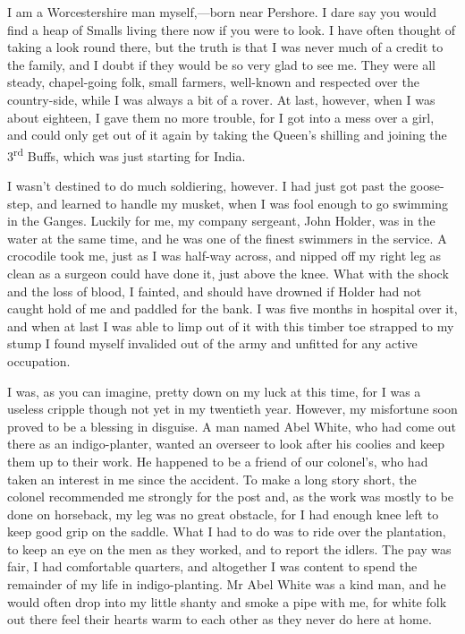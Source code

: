I am a Worcestershire man myself,—born near Pershore. I dare say you would find a heap of Smalls living there now if you were to look. I have often thought of taking a look round there, but the truth is that I was never much of a credit to the family, and I doubt if they would be so very glad to see me. They were all steady, chapel-going folk, small farmers, well-known and respected over the country-side, while I was always a bit of a rover. At last, however, when I was about eighteen, I gave them no more trouble, for I got into a mess over a girl, and could only get out of it again by taking the Queen's shilling and joining the 3\textsuperscript{rd} Buffs, which was just starting for India.

I wasn't destined to do much soldiering, however. I had just got past the goose-step, and learned to handle my musket, when I was fool enough to go swimming in the Ganges. Luckily for me, my company sergeant, John Holder, was in the water at the same time, and he was one of the finest swimmers in the service. A crocodile took me, just as I was half-way across, and nipped off my right leg as clean as a surgeon could have done it, just above the knee. What with the shock and the loss of blood, I fainted, and should have drowned if Holder had not caught hold of me and paddled for the bank. I was five months in hospital over it, and when at last I was able to limp out of it with this timber toe strapped to my stump I found myself invalided out of the army and unfitted for any active occupation.

I was, as you can imagine, pretty down on my luck at this time, for I was a useless cripple though not yet in my twentieth year. However, my misfortune soon proved to be a blessing in disguise. A man named Abel White, who had come out there as an indigo-planter, wanted an overseer to look after his coolies and keep them up to their work. He happened to be a friend of our colonel's, who had taken an interest in me since the accident. To make a long story short, the colonel recommended me strongly for the post and, as the work was mostly to be done on horseback, my leg was no great obstacle, for I had enough knee left to keep good grip on the saddle. What I had to do was to ride over the plantation, to keep an eye on the men as they worked, and to report the idlers. The pay was fair, I had comfortable quarters, and altogether I was content to spend the remainder of my life in indigo-planting. Mr Abel White was a kind man, and he would often drop into my little shanty and smoke a pipe with me, for white folk out there feel their hearts warm to each other as they never do here at home.

